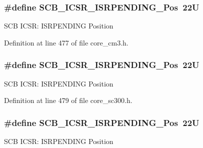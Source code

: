 \subsubsection[{\texorpdfstring{S\+C\+B\+\_\+\+I\+C\+S\+R\+\_\+\+I\+S\+R\+P\+E\+N\+D\+I\+N\+G\+\_\+\+Pos}{SCB_ICSR_ISRPENDING_Pos}}]{\setlength{\rightskip}{0pt plus 5cm}\#define S\+C\+B\+\_\+\+I\+C\+S\+R\+\_\+\+I\+S\+R\+P\+E\+N\+D\+I\+N\+G\+\_\+\+Pos~22U}\hypertarget{group___c_m_s_i_s___s_c_b_ga10749d92b9b744094b845c2eb46d4319}{}\label{group___c_m_s_i_s___s_c_b_ga10749d92b9b744094b845c2eb46d4319}
S\+CB I\+C\+SR\+: I\+S\+R\+P\+E\+N\+D\+I\+NG Position 

Definition at line 477 of file core\+\_\+cm3.\+h.

\subsubsection[{\texorpdfstring{S\+C\+B\+\_\+\+I\+C\+S\+R\+\_\+\+I\+S\+R\+P\+E\+N\+D\+I\+N\+G\+\_\+\+Pos}{SCB_ICSR_ISRPENDING_Pos}}]{\setlength{\rightskip}{0pt plus 5cm}\#define S\+C\+B\+\_\+\+I\+C\+S\+R\+\_\+\+I\+S\+R\+P\+E\+N\+D\+I\+N\+G\+\_\+\+Pos~22U}\hypertarget{group___c_m_s_i_s___s_c_b_ga10749d92b9b744094b845c2eb46d4319}{}\label{group___c_m_s_i_s___s_c_b_ga10749d92b9b744094b845c2eb46d4319}
S\+CB I\+C\+SR\+: I\+S\+R\+P\+E\+N\+D\+I\+NG Position 

Definition at line 479 of file core\+\_\+sc300.\+h.

\subsubsection[{\texorpdfstring{S\+C\+B\+\_\+\+I\+C\+S\+R\+\_\+\+I\+S\+R\+P\+E\+N\+D\+I\+N\+G\+\_\+\+Pos}{SCB_ICSR_ISRPENDING_Pos}}]{\setlength{\rightskip}{0pt plus 5cm}\#define S\+C\+B\+\_\+\+I\+C\+S\+R\+\_\+\+I\+S\+R\+P\+E\+N\+D\+I\+N\+G\+\_\+\+Pos~22U}\hypertarget{group___c_m_s_i_s___s_c_b_ga10749d92b9b744094b845c2eb46d4319}{}\label{group___c_m_s_i_s___s_c_b_ga10749d92b9b744094b845c2eb46d4319}
S\+CB I\+C\+SR\+: I\+S\+R\+P\+E\+N\+D\+I\+NG Position 


